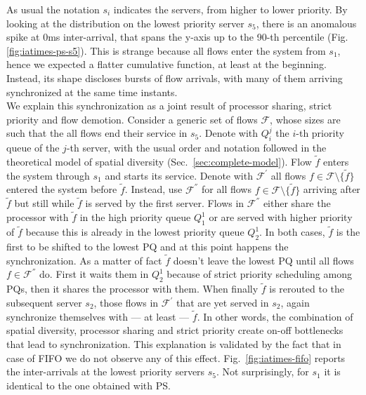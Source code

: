 As usual the notation $s_i$ indicates the servers, from higher to lower priority. By looking at the distribution on the lowest priority server $s_5$, there is an anomalous spike at 0ms inter-arrival, that spans the y-axis up to the 90-th percentile (Fig.\ref{fig:iatimes-ps-s5}). This is strange because all flows enter the system from $s_1$, hence we expected a flatter cumulative function, at least at the beginning. Instead, its shape discloses bursts of flow arrivals, with many of them arriving synchronized at the same time instants. \\
We explain this synchronization as a joint result of processor sharing, strict priority and flow demotion. Consider a generic set of flows $\mathcal{F}$, whose sizes are such that the all flows end their service in $s_5$. Denote with $Q_i^j$ the $i$-th priority queue of the $j$-th server, with the usual order and notation followed in the theoretical model of spatial diversity (Sec.~\ref{sec:complete-model}). Flow $\tilde{f}$ enters the system through $s_1$ and starts its service. Denote with $\mathcal{F}^\prime$  all flows $f \in \mathcal{F} \setminus \{\tilde{f}\}$ entered the system before $\tilde{f}$. Instead, use $\mathcal{F}^{\dprime}$ for all flows $f \in \mathcal{F} \setminus \{\tilde{f}\}$ arriving after $\tilde{f}$ but still while $\tilde{f}$ is served by the first server. Flows in $\mathcal{F}^{\dprime}$ either share the processor with $\tilde{f}$ in the high priority queue $Q_1^1$ or are served with higher priority of $\tilde{f}$ because this is already in the lowest priority queue $Q_2^1$.  In both cases, $\tilde{f}$ is the first to be shifted to the lowest PQ and at this point happens the synchronization. As a matter of fact $\tilde{f}$ doesn't leave the lowest PQ until all flows $f \in \mathcal{F}^{\dprime}$ do. First it waits them in $Q_2^1$ because of strict priority scheduling among PQs, then it shares the processor with them. When finally $\tilde{f}$ is rerouted to the subsequent server $s_2$, those flows in $\mathcal{F}^\prime$ that are yet served in $s_2$, again synchronize themselves with --- at least --- $\tilde{f}$.  In other words, the combination of spatial diversity, processor sharing and strict priority create on-off bottlenecks that lead to synchronization. This explanation is validated by the fact that in case of FIFO we do not observe any of this effect. Fig.~\ref{fig:iatimes-fifo} reports the inter-arrivals at the lowest priority servers $s_5$. Not surprisingly, for $s_1$ it is identical to the one obtained with PS.
